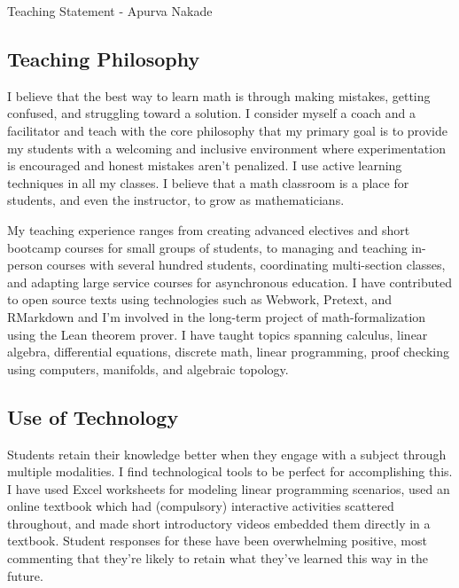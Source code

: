 \documentclass[10pt]{amsbook}
\begin{document}
\begin{center}
  \huge{Teaching Statement - Apurva Nakade}
\end{center}
\vspace{1em}

\subsection*{Teaching Philosophy}
  I believe that the best way to learn math is through making mistakes, getting confused, and struggling toward a solution. I consider myself a coach and a facilitator and teach with the core philosophy that my primary goal is to provide my students with a welcoming and inclusive environment where experimentation is encouraged and honest mistakes aren't penalized. 
  I use active learning techniques in all my classes. 
  I believe that a math classroom is a place for students, and even the instructor, to grow as mathematicians.

  My teaching experience ranges from creating advanced electives and short bootcamp courses for small groups of students, to managing and teaching in-person courses with several hundred students, coordinating multi-section classes, and adapting large service courses for asynchronous education. I have contributed to open source texts using technologies such as Webwork, Pretext, and RMarkdown and I'm involved in the long-term project of math-formalization using the Lean theorem prover. I have taught topics spanning calculus, linear algebra, differential equations, discrete math, linear programming, proof checking using computers, manifolds, and algebraic topology.

  \subsection*{Use of Technology}
  Students retain their knowledge better when they engage with a subject through multiple modalities. I find technological tools to be perfect for accomplishing this. I have used Excel worksheets for modeling linear programming scenarios, used an online textbook which had (compulsory) interactive activities scattered throughout, and made short introductory videos embedded them directly in a textbook. 
  Student responses for these have been overwhelming positive, most commenting that they're likely to retain what they've learned this way in the future.
\end{document}
